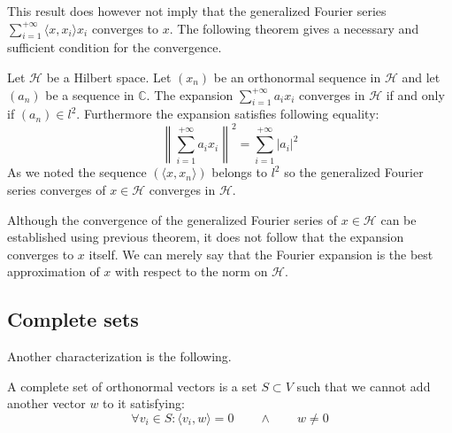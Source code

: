 	This result does however not imply that the generalized Fourier series $\sum_{i=1}^{+\infty}\langle x, x_i\rangle x_i$ converges to $x$. The following theorem gives a necessary and sufficient condition for the convergence.
	\begin{theorem}
		Let $\mathcal{H}$ be a Hilbert space. Let $(x_n)$ be an orthonormal sequence in $\mathcal{H}$ and let $(a_n)$ be a sequence in $\mathbb{C}$. The expansion $\sum_{i=1}^{+\infty}a_ix_i$ converges in $\mathcal{H}$ if and only if $(a_n)\in l^2$. Furthermore the expansion satisfies following equality:
		\begin{equation}
			\left\lVert\sum_{i=1}^{+\infty}a_ix_i\right\rVert^2 = \sum_{i=1}^{+\infty}|a_i|^2
		\end{equation}
		As we noted the sequence $(\langle x, x_n\rangle)$ belongs to $l^2$ so the generalized Fourier series converges of $x\in\mathcal{H}$ converges in $\mathcal{H}$.
	\end{theorem}
	\begin{remark}
		Although the convergence of the generalized Fourier series of $x\in\mathcal{H}$ can be established using previous theorem, it does not follow that the expansion converges to $x$ itself. We can merely say that the Fourier expansion is the best approximation of $x$ with respect to the norm on $\mathcal{H}$.
	\end{remark}
    
\subsection{Complete sets}

	Another characterization is the following.
	\begin{adefinition}
		A complete set of orthonormal vectors is a set $S\subset V$ such that we cannot add another vector $w$ to it satisfying:
		\begin{equation}
			\forall v_i\in S: \langle v_i, w\rangle = 0\qquad\land\qquad  w\neq0
		\end{equation}
	\end{adefinition}
	
